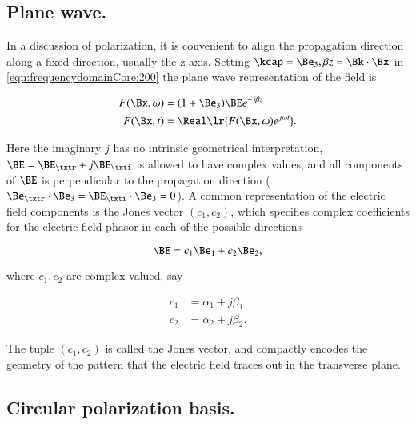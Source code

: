 %
%
\subsection{Plane wave.}
In a discussion of polarization, it is convenient to align the propagation direction along a fixed direction, usually the z-axis.
Setting \( \kcap = \Be_3, \beta z = \Bk \cdot \Bx \) in \cref{eqn:frequencydomainCore:200} the plane wave representation of the field is

\begin{dmath}\label{eqn:polarization:20}
\begin{aligned}
F(\Bx, \omega) &= (1 + \Be_3) \BE e^{-j \beta z} \\
F(\Bx, t) &= \Real\lr{ F(\Bx, \omega) e^{j \omega t} }.
\end{aligned}
\end{dmath}

Here the imaginary \( j \) has no intrinsic geometrical interpretation, \( \BE = \BE_\txtr + j \BE_\txti \) is allowed to have complex values, and all components of \( \BE \) is perpendicular to the propagation direction (\( \Be_\txtr \cdot \Be_3 = \BE_\txti \cdot \Be_3 = 0 \)).
A common representation of the electric field components is the Jones vector \( (c_1, c_2) \), which specifies complex coefficients for the electric field phasor in each of the possible directions

\begin{dmath}\label{eqn:polarization:120}
\BE = c_1 \Be_1 + c_2 \Be_2,
\end{dmath}

where \( c_1, c_2 \) are complex valued, say

\begin{dmath}\label{eqn:polarization:140}
\begin{aligned}
c_1 &= \alpha_1 + j \beta_1 \\
c_2 &= \alpha_2 + j \beta_2.
\end{aligned}
\end{dmath}

The tuple \( (c_1, c_2) \) is called the Jones vector, and compactly encodes the geometry of the pattern that the electric field traces out in the transverse plane.

\subsection{Circular polarization basis.}

